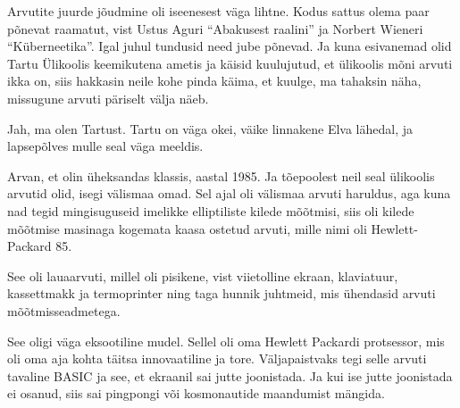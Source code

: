 

Arvutite juurde jõudmine oli iseenesest väga lihtne. Kodus sattus olema paar 
põnevat raamatut, vist Ustus 
Aguri \enquote{Abakusest raalini} ja Norbert Wieneri \enquote{Küberneetika}. Igal juhul tundusid need jube põnevad. Ja kuna esivanemad olid Tartu Ülikoolis keemikutena 
ametis ja käisid kuulujutud, et ülikoolis mõni arvuti ikka on, siis hakkasin 
neile kohe pinda käima, et kuulge, ma tahaksin näha, missugune 
arvuti päriselt välja näeb.


Jah, ma olen Tartust. Tartu on väga okei, väike 
linnakene Elva lähedal, ja lapsepõlves mulle seal väga meeldis. 


Arvan, et olin
üheksandas klassis, aastal 1985. Ja tõepoolest neil seal ülikoolis arvutid olid, isegi välismaa 
omad. Sel ajal oli välismaa arvuti haruldus, 
aga kuna nad tegid mingisuguseid imelikke elliptiliste kilede mõõtmisi, siis 
oli kilede mõõtmise masinaga kogemata kaasa ostetud arvuti, mille nimi 
oli Hewlett-Packard 85. 


See oli lauaarvuti, millel oli pisikene, vist viietolline ekraan, 
klaviatuur, kassettmakk ja termoprinter ning taga hunnik juhtmeid, mis 
ühendasid arvuti mõõtmisseadmetega.


See oligi väga eksootiline mudel. Sellel oli oma Hewlett 
Packardi protsessor, mis oli oma aja kohta täitsa innovaatiline ja 
tore. Väljapaistvaks tegi selle arvuti tavaline 
BASIC ja see, et ekraanil sai jutte joonistada. Ja kui 
ise jutte joonistada ei osanud, siis sai pingpongi või kosmonautide maandumist 
mängida. 

